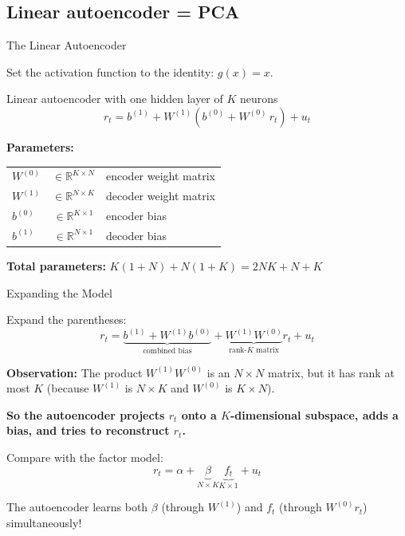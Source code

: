 \documentclass[aspectratio=169]{beamer}
\newcommand{\R}{\mathbb{R}}
\begin{document}
\subsection{Linear autoencoder = PCA}
%
\begin{frame}{The Linear Autoencoder}

Set the activation function to the identity: $g(x) = x$.

\begin{block}{Linear autoencoder with one hidden layer of $K$ neurons}
\vspace{0.5em}
\[
r_t = b^{(1)} + W^{(1)}\!\left(b^{(0)} + W^{(0)}\, r_t\right) + u_t
\]
\vspace{0.5em}
\end{block}

\vspace{0.3em}
\textbf{Parameters:}
\begin{center}
\renewcommand{\arraystretch}{1.2}
\begin{tabular}{lcl}
$W^{(0)}$ & $\in \R^{K \times N}$ & encoder weight matrix \\
$W^{(1)}$ & $\in \R^{N \times K}$ & decoder weight matrix \\
$b^{(0)}$ & $\in \R^{K \times 1}$ & encoder bias \\
$b^{(1)}$ & $\in \R^{N \times 1}$ & decoder bias \\
\end{tabular}
\end{center}

\vspace{0.3em}
\textbf{Total parameters:} $K(1+N) + N(1+K) = 2NK + N + K$

\end{frame}
%
%
\begin{frame}{Expanding the Model}

Expand the parentheses:
\[
r_t = \underbrace{b^{(1)} + W^{(1)}b^{(0)}}_{\text{combined bias}} + \underbrace{W^{(1)}W^{(0)}}_{\text{rank-$K$ matrix}} r_t + u_t
\]

\vspace{0.5em}
\textbf{Observation:} The product $W^{(1)}W^{(0)}$ is an $N \times N$ matrix, but it has rank at most $K$ (because $W^{(1)}$ is $N \times K$ and $W^{(0)}$ is $K \times N$).

\vspace{0.5em}
\textbf{So the autoencoder projects $r_t$ onto a $K$-dimensional subspace, adds a bias, and tries to reconstruct $r_t$.}

\vspace{0.5em}
Compare with the factor model:
\[
r_t = \alpha + \underbrace{\beta}_{\text{$N \times K$}} \underbrace{f_t}_{\text{$K \times 1$}} + u_t
\]

The autoencoder learns both $\beta$ (through $W^{(1)}$) and $f_t$ (through $W^{(0)}r_t$) simultaneously!
\end{frame}
\end{document}
